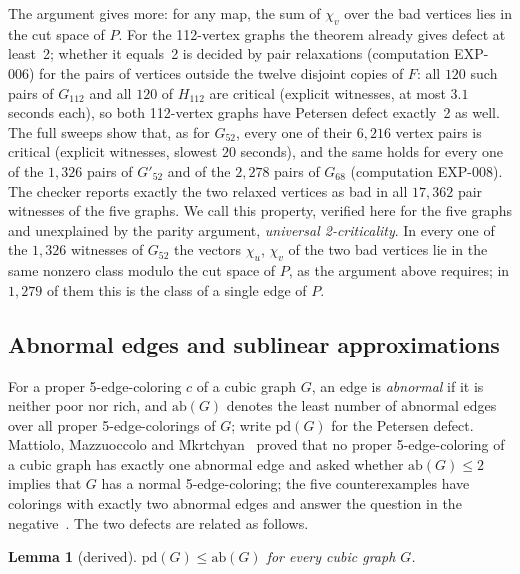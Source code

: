 \documentclass[11pt]{article}
\newtheorem{lemma}[theorem]{Lemma}
\theoremstyle{definition}
\theoremstyle{remark}
\newcommand{\PG}{P}
\newcommand{\Gmain}{G_{112}}
\newcommand{\Gsym}{H_{112}}
\newcommand{\Gfty}{G_{52}}
\newcommand{\Gftyb}{G'_{52}}
\newcommand{\Gsix}{G_{68}}
\newcommand{\pd}{\mathrm{pd}}
\newcommand{\ab}{\mathrm{ab}}
\begin{document}
The argument gives more: for any map, the sum of $\chi_v$ over the bad vertices lies in the cut
space of $\PG$. For the 112-vertex graphs the theorem already gives defect at least~2; whether
it equals~2 is decided by pair relaxations (computation EXP-006) for the pairs of vertices
outside the twelve disjoint copies of $F$: all $120$ such pairs of
$\Gmain$ and all $120$ of $\Gsym$ are critical (explicit witnesses, at most $3.1$ seconds each),
so both 112-vertex graphs have Petersen defect exactly~2 as well. The full sweeps show
that, as for $\Gfty$, every one of their $6{,}216$ vertex pairs is critical (explicit
witnesses, slowest $20$ seconds), and the same holds for every one of the $1{,}326$ pairs of
$\Gftyb$ and of the $2{,}278$ pairs of $\Gsix$ (computation EXP-008). The checker reports exactly
the two relaxed vertices as bad in all $17{,}362$ pair witnesses of the five graphs. We call this
property, verified here for the five graphs and unexplained by the parity argument,
\emph{universal 2-criticality}. In every one of the $1{,}326$ witnesses of $\Gfty$ the vectors
$\chi_u$, $\chi_v$ of the two bad vertices lie in the same nonzero class modulo the cut space of
$\PG$, as the argument above requires; in $1{,}279$ of them this is the class of a single edge of
$\PG$.

\subsection{Abnormal edges and sublinear approximations}\label{sec:abnormal}

For a proper 5-edge-coloring $c$ of a cubic graph $G$, an edge is \emph{abnormal} if it is neither
poor nor rich, and $\ab(G)$ denotes the least number of abnormal edges over all proper
5-edge-colorings of $G$; write $\pd(G)$ for the Petersen defect. Mattiolo, Mazzuoccolo and
Mkrtchyan~\cite{MMM2021} proved that no proper 5-edge-coloring of a cubic graph has exactly one
abnormal edge and asked whether $\ab(G) \le 2$ implies that $G$ has a normal 5-edge-coloring; the
five counterexamples have colorings with exactly two abnormal edges and answer the question in the
negative~\cite{GJMMMU2026}. The two defects are related as follows.

\begin{lemma}[derived]\label{lem:pdab}
$\pd(G) \le \ab(G)$ for every cubic graph $G$.
\end{lemma}
\end{document}
